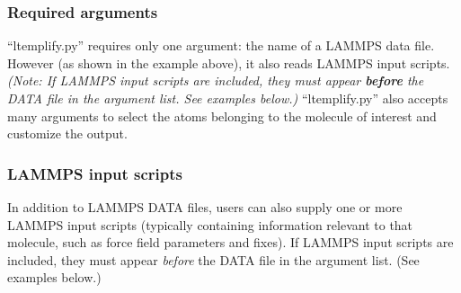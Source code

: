 \documentclass[11pt]{article}
\begin{document}
\subsubsection*{Required arguments}

``ltemplify.py'' requires only one argument: the name of a LAMMPS data file.
However (as shown in the example above), it also reads LAMMPS input scripts.
\textit{(Note: If LAMMPS input scripts are included, they must appear
\textbf{before} the DATA file in the argument list.  See examples below.)}
``ltemplify.py'' also accepts many arguments to select the atoms belonging
to the molecule of interest and customize the output.

\subsubsection*{LAMMPS input scripts}

In addition to LAMMPS DATA files, users can also supply
one or more LAMMPS input scripts
(typically containing information relevant to that molecule,
such as force field parameters and fixes).
If LAMMPS input scripts are included, they must appear \textit{before}
the DATA file in the argument list. (See examples below.)

\pagebreak
\end{document}
